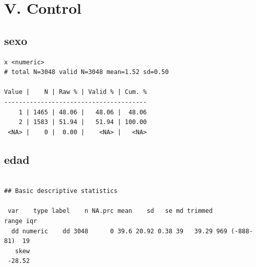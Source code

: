 \documentclass[
  letterpaper,
  DIV=11,
  numbers=noendperiod]{scrreprt}
\newenvironment{Shaded}{\begin{snugshade}}{\end{snugshade}}
\newcommand{\AttributeTok}[1]{\textcolor[rgb]{0.40,0.45,0.13}{#1}}
\newcommand{\FunctionTok}[1]{\textcolor[rgb]{0.28,0.35,0.67}{#1}}
\newcommand{\NormalTok}[1]{\textcolor[rgb]{0.00,0.23,0.31}{#1}}
\newcommand{\OtherTok}[1]{\textcolor[rgb]{0.00,0.23,0.31}{#1}}
\newcommand{\SpecialCharTok}[1]{\textcolor[rgb]{0.37,0.37,0.37}{#1}}
\newcommand{\StringTok}[1]{\textcolor[rgb]{0.13,0.47,0.30}{#1}}
\begin{document}
\hypertarget{v.-control}{%
\section{V. Control}\label{v.-control}}

\hypertarget{sexo}{%
\subsection{sexo}\label{sexo}}

\begin{Shaded}
\end{Shaded}

\begin{verbatim}
x <numeric> 
# total N=3048 valid N=3048 mean=1.52 sd=0.50

Value |    N | Raw % | Valid % | Cum. %
---------------------------------------
    1 | 1465 | 48.06 |   48.06 |  48.06
    2 | 1583 | 51.94 |   51.94 | 100.00
 <NA> |    0 |  0.00 |    <NA> |   <NA>
\end{verbatim}

\hypertarget{edad}{%
\subsection{edad}\label{edad}}

\begin{Shaded}
\end{Shaded}

\begin{verbatim}

## Basic descriptive statistics

 var    type label    n NA.prc mean    sd   se md trimmed         range iqr
  dd numeric    dd 3048      0 39.6 20.92 0.38 39   39.29 969 (-888-81)  19
   skew
 -28.52
\end{verbatim}

\begin{Shaded}
\end{Shaded}
\end{document}
